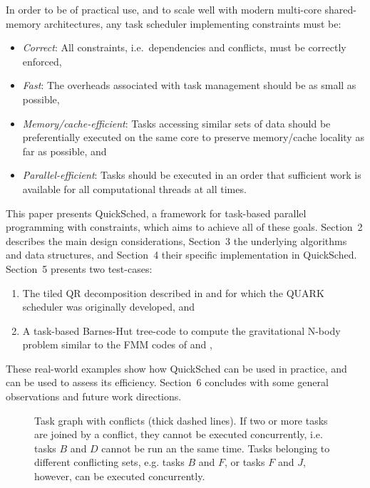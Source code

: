 \documentclass[preprint]{elsarticle}
\begin{document}
In order to be of practical use, and to scale well with modern
multi-core shared-memory architectures, any task scheduler
implementing constraints must be:
\begin{itemize}
    \item {\em Correct}: All constraints, i.e.~dependencies and
        conflicts, must be correctly enforced,
    \item {\em Fast}: The overheads associated with task management
        should be as small as possible,
    \item {\em Memory/cache-efficient}: Tasks accessing similar
        sets of data should be preferentially executed on the
        same core to preserve memory/cache locality as far as possible, and
    \item {\em Parallel-efficient}: Tasks should be executed in an order
        that sufficient work is available for all computational
        threads at all times.
\end{itemize}
\noindent This paper presents QuickSched, a framework for task-based
parallel programming with constraints, which aims to achieve
all of these goals.
Section~2 describes the main design considerations, Section~3 the
underlying algorithms and data structures, and
Section~4 their specific implementation in QuickSched.
Section~5 presents two test-cases:
\begin{enumerate}
    \item The tiled QR
    decomposition described in \cite{ref:Buttari2009} and for
    which the QUARK scheduler was originally developed, and
    \item A task-based Barnes-Hut tree-code to compute the
    gravitational N-body problem similar to the FMM codes
    of \cite{ref:Ltaief2012} and \cite{ref:Agullo2013},
\end{enumerate}
These real-world examples show how QuickSched can be used in practice,
and can be used to assess its efficiency.
Section~6 concludes with some general observations and future work
directions.

\begin{figure}
    \centerline{}
    \caption{Task graph with conflicts (thick dashed lines).
        If two or more tasks are joined by a conflict, they cannot be
        executed concurrently, i.e. tasks $B$ and $D$ cannot be run an
        the same time.
        Tasks belonging to different conflicting sets, e.g. tasks $B$
        and $F$, or tasks $F$ and $J$, however, can be executed
        concurrently.}
    \label{fig:TaskConflicts}
\end{figure}
\end{document}
